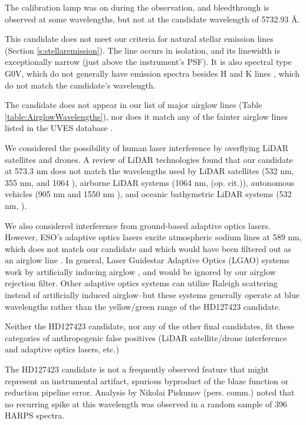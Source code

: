 \documentclass[linenumbers]{aastex631}
\begin{document}
The calibration lamp was on during the observation, and bleedthrough is observed at some wavelengths, but not at the candidate wavelength of 5732.93 \AA.

This candidate does not meet our criteria for natural stellar emission lines (Section \ref{s:stellaremission}).  The line occurs in isolation, and its linewidth is exceptionally narrow (just above the instrument's PSF). It is also spectral type G0V, which do not generally have emission spectra besides H and K lines \citep{HandKemissionlines}, which do not match the candidate's wavelength. 

The candidate does not appear in our list of major airglow lines (Table \ref{table:AirglowWavelengths}), nor does it match any of the fainter airglow lines listed in the UVES database \citep{faint_airglow_database} \citep{UVES_database}. 

We considered the possibility of human laser interference by overflying LiDAR satellites and drones.  A review of LiDAR technologies found that our candidate at 573.3 nm does not match the wavelengths used by LiDAR satellites (532 nm, 355 nm, and 1064 \citep{lidar_history}), airborne LiDAR systems (1064 nm, (op. cit.)), autonomous vehicles (905 nm and 1550 nm \citep{vehicle_lidar}), and oceanic bathymetric LiDAR systems (532 nm, \citep{bathymetric_lidar}). 

We also considered interference from ground-based adaptive optics lasers. However, ESO's adaptive optics lasers excite atmospheric sodium lines at 589 nm, which does not match our candidate and which would have been filtered out as an airglow line \citep{HARPS_guidestars}. In general, Laser Guidestar Adaptive Optics (LGAO) systems work by artificially inducing airglow \citep{LaserGuideStarAdaptiveOptics}, and would be ignored by our airglow rejection filter.  Other adaptive optics systems can utilize Raleigh scattering instead of artificially induced airglow--but these systems generally operate at blue wavelengths \citep{RaleighScattering} rather than the yellow/green range of the HD127423 candidate.

Neither the HD127423 candidate, nor any of the other final candidates, fit these categories of anthropogenic false positives (LiDAR satellite/drone interference and adaptive optics lasers, etc.)

The HD127423 candidate is not a frequently observed feature that might represent an instrumental artifact, spurious byproduct of the blaze function or reduction pipeline error. Analysis by Nikolai Piskunov (pers. comm.) noted that no recurring spike at this wavelength was observed in a random sample of 396 HARPS spectra. 
\end{document}
